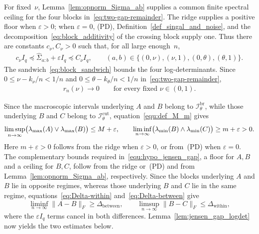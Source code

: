 \documentclass[10pt, letterpaper]{amsart}
\def\min{{\rm min}}
\begin{document}
For fixed~$\nu$, Lemma~\ref{lem:opnorm_Sigma_ab} supplies a common finite
spectral ceiling for the four blocks in~\eqref{eq:two-gap-remainder}.
The ridge supplies a positive floor when $\varepsilon>0$; when
$\varepsilon=0$, (PD), Definition~\ref{def_singal_and_noise}, and the
 decomposition~\eqref{eq:block_additivity} of the crossing block supply one. Thus there are
constants $c_\nu,C_\nu>0$ such that, for all large enough~$n$,
\begin{align}\label{eq:block_sandwich}
c_\nu I_q
\preceq\widehat\Sigma_{a:b}+\varepsilon I_q
\preceq C_\nu I_q,
\qquad
(a,b)\in\{(0,\nu),(\nu,1),(0,\theta),(\theta,1)\}.
\end{align}
The sandwich~\eqref{eq:block_sandwich} bounds the four log-determinants.
 Since $0\leq\nu-k_\nu/n<1/n$ and $0\leq\theta-k_\theta/n<1/n$ in~\eqref{eq:two-gap-remainder},
\begin{align}\label{eq:remainder_vanishes}
r_n(\nu)\longrightarrow0
\qquad\text{for every fixed }\nu\in(0,1).
\end{align}

Since the macroscopic intervals underlying $A$ and $B$ belong to $\mathcal I_\theta^{\mathrm{br}}$, while those underlying $B$ and $C$ belong to $\mathcal I_\theta^{\mathrm{cut}}$, equation~\eqref{equ:def_M_m} gives
\[
\limsup_{n\to\infty}\bigl(\lambda_{\max}(A)\vee\lambda_{\max}(B)\bigr)
\leq M+\varepsilon,
\qquad
\liminf_{n\to\infty}\bigl(\lambda_{\min}(B)\wedge\lambda_{\min}(C)\bigr)
\geq m+\varepsilon>0.
\]
Here $m+\varepsilon>0$ follows from the ridge when $\varepsilon>0$, or from~(PD) when $\varepsilon=0$. The complementary bounds required in~\eqref{equ:hypo_jensen_gap}, a floor for $A,B$ and a ceiling for $B,C$, follow from the ridge or~(PD) and from Lemma~\ref{lem:opnorm_Sigma_ab}, respectively. Since the blocks underlying $A$ and $B$ lie in opposite regimes, whereas those underlying $B$ and $C$ lie in the same regime, equations~\eqref{eq:Delta-within} and~\eqref{eq:Delta-between} give
\[
\liminf_{n\to\infty}\|A-B\|_F\geq\Delta_{\mathrm{between}},
\qquad
\limsup_{n\to\infty}\|B-C\|_F\leq\Delta_{\mathrm{within}},
\]
where the $\varepsilon I_q$ terms cancel in both differences. Lemma~\ref{lem:jensen_gap_logdet} now yields the two estimates below.
\end{document}
